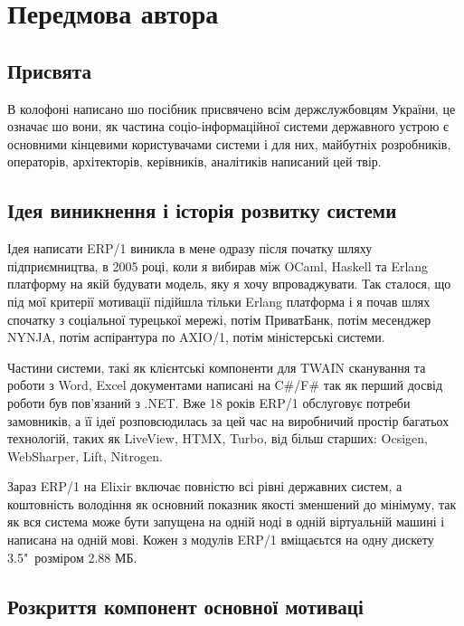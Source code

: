 \chapter*{Передмова автора}

\section*{Присвята}

В колофоні написано шо посібник присвячено всім держслужбовцям України,
це означає шо вони, як частина соціо-інформаційної системи державного устрою
є основними кінцевими користувачами системи і для них, майбутніх розробників,
операторів, архітекторів, керівників, аналітиків написаний цей твір.

\section*{Ідея виникнення і історія розвитку системи}

Ідея написати ERP/1 виникла в мене одразу після початку шляху
підприємництва, в 2005 році, коли я вибирав між OCaml, Haskell та Erlang платформу
на якій будувати модель, яку я хочу впроваджувати. Так сталося, що під мої
критерії мотивації підійшла тільки Erlang платформа і я почав шлях
спочатку з соціальної турецької мережі, потім ПриватБанк, потім месенджер NYNJA,
потім аспірантура по AXIO/1, потім міністерські системи.

Частини системи, такі як клієнтські компоненти для TWAIN сканування та роботи з Word, Excel
документами написані на C\#/F\# так як перший досвід роботи був пов'язаний з .NET.
Вже 18 років ERP/1 обслуговує потреби замовників, а її ідеї розповсюдилась за цей час
на виробничий простір багатьох технологій, таких як LiveView, HTMX, Turbo, від більш старших:
Ocsigen, WebSharper, Lift, Nitrogen.

Зараз ERP/1 на Elixir включає повністю всі рівні державних систем, а коштовність
володіння як основний показник якості зменшений до мінімуму, так як вся система
може бути запущена на одній ноді в одній віртуальній машині і написана на одній мові.
Кожен з модулів ERP/1 вміщаєьтся на одну дискету 3.5"\ розміром 2.88 МБ.

\newpage
\section*{Розкриття компонент основної мотиваці}

